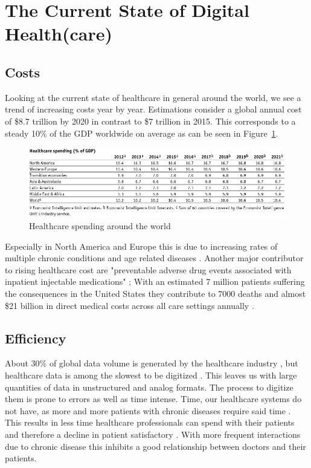 \section{The Current State of Digital Health(care)}
\subsection{Costs}
Looking at the current state of healthcare in general around the world, we see a trend of increasing costs year by year. Estimations consider a global annual cost of \$8.7 trillion by 2020 in contrast to \$7 trillion in 2015. This corresponds to a steady 10\% of the GDP worldwide on average as can be seen in Figure~\ref{fig:GDPSpendingHC}.
\begin{figure}[htpb]
    \centering
    \includegraphics[width=\linewidth]{media/Screenshot_2020-01-09_01_FULL_REPORT-World_healthcare_and.png}
    \caption{Healthcare spending around the world \cite{EIU2016}}%
    \label{fig:GDPSpendingHC}
\end{figure}
Especially in North America and Europe this is due to increasing rates of multiple chronic conditions and age related diseases \cite{sambamoorthi2015multiple}. Another major contributor to rising healthcare cost are "preventable adverse drug events associated with inpatient injectable medications" \cite{lahue2012national}; With an estimated 7 million patients suffering the consequences in the United States they contribute to 7000 deaths and almost \$21 billion in direct medical costs across all care settings annually \cite{prevMedErrors}.
\subsection{Efficiency}
About 30\% of global data volume is generated by the healthcare industry \cite{gopal2019digital}, but healthcare data is among the slowest to be digitized \cite{industryDigitalization}. This leaves us with large quantities of data in unstructured and analog formats. The process to digitize them is prone to errors as well as time intense. Time, our healthcare systems do not have, as more and more patients with chronic diseases require said time \cite{ostbye2005there}. This results in less time healthcare professionals can spend with their patients \cite{fuchtbauer2013emergency} and therefore a decline in patient satisfactory \cite{gross1998patient}. With more frequent interactions due to chronic disease this inhibits a good relationship between doctors and their patients.
